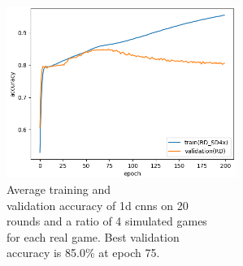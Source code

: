\begin{minipage}{0.5\textwidth}
	\begin{figure}[H]
		\centering
		\includegraphics[width=7.5cm]{images/bestHistories/2d_40s_sd4x_acc.png}
		\caption[Bild kurz]{Average training and \\\hspace{0\textwidth}validation accuracy of 1d cnns on 20\\\hspace{0\textwidth} rounds and a ratio of 4 simulated games \\\hspace{0\textwidth} for each real game. Best validation \\\hspace{0\textwidth}accuracy is 85.0\% at epoch 75.}
		\label{fig:2d40}
	\end{figure}
\end{minipage}


